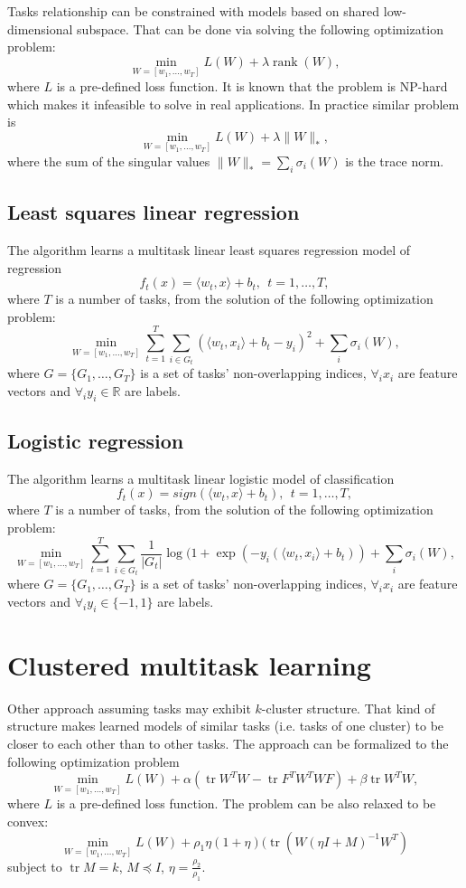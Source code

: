 Tasks relationship can be constrained with models based on shared low-dimensional subspace. That can be done
via solving the following optimization problem:
$$
\min_{W=\left[w_1, \dots, w_T\right]} L (W) + \lambda \mathop{\mathrm{rank}}(W),
$$
where $L$ is a pre-defined loss function. It is known that the problem is NP-hard which makes it infeasible
to solve in real applications. In practice similar problem is
$$
\min_{W=\left[w_1, \dots, w_T\right]} L (W) + \lambda \|W\|_{*},
$$
where the sum of the singular values $\|W\|_{*} = \sum_i \sigma_i(W)$ is the trace norm.

\subsection{Least squares linear regression}

The algorithm learns a multitask linear least squares regression model of regression 
$$
f_t(x) = \langle w_t,x \rangle + b_t, ~~ t = 1, \dots, T,
$$
where $T$ is a number of tasks, from the solution of the following optimization problem:
$$
\min_{W=\left[w_1, \dots, w_T\right]} \sum_{t=1}^{T} \sum_{i \in G_t} \left(\langle w_t,x_i \rangle + b_t - y_i\right)^2
+ \sum_i \sigma_i(W),
$$
where $G = \{ G_1, \dots, G_T \}$ is a set of tasks' non-overlapping indices, $\forall_i x_i$ are feature 
vectors and $\forall_i y_i \in \mathbb{R}$ are labels.

\subsection{Logistic regression}

The algorithm learns a multitask linear logistic model of classification 
$$
f_t(x) = sign (\langle w_t,x \rangle + b_t), ~~ t = 1, \dots, T,
$$
where $T$ is a number of tasks, from the solution of the following optimization problem:
$$
\min_{W=\left[w_1, \dots, w_T\right]} \sum_{t=1}^{T} \sum_{i \in G_t} \frac{1}{|G_t|} \log (1+\exp\left(-y_i(\langle w_t,x_i \rangle + b_t)\right)
+ \sum_i \sigma_i(W),
$$
where $G = \{ G_1, \dots, G_T \}$ is a set of tasks' non-overlapping indices, $\forall_i x_i$ are feature 
vectors and $\forall_i y_i \in \{-1,1\}$ are labels.

\section{Clustered multitask learning}

Other approach assuming tasks may exhibit $k$-cluster structure. That kind of structure
makes learned models of similar tasks (i.e. tasks of one cluster) to be closer to each 
other than to other tasks. The approach can be formalized to the following optimization
problem
$$
\min_{W=\left[w_1, \dots, w_T\right]} L (W) + \alpha (\mathop{\mathrm{tr}} W^{T} W - \mathop{\mathrm{tr}} F^{T} W^{T} W F) + \beta \mathop{\mathrm{tr}} W^{T} W,
$$
where $L$ is a pre-defined loss function. The problem can be also relaxed to be convex:
$$
\min_{W=\left[w_1, \dots, w_T\right]} L (W) + \rho_1 \eta (1+\eta) (\mathop{\mathrm{tr}} (W (\eta I + M)^{-1} W^{T})
$$
subject to $\mathop{\mathrm{tr}} M = k$, $M \preceq I$, $\eta = \frac{\rho_2}{\rho_1}$.

